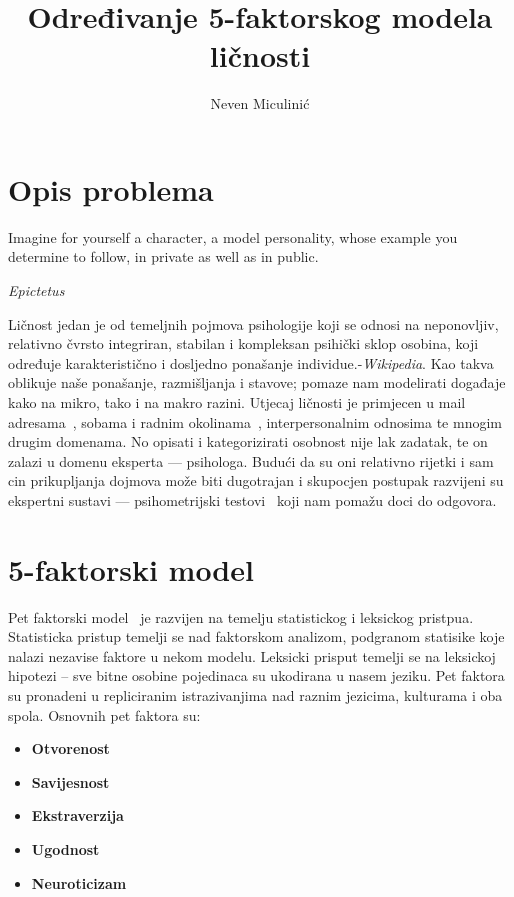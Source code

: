 \documentclass[times, utf8, seminar]{fer}
\begin{document}
\theoremstyle{definition}
\newtheorem{definition}{Definition}[section]

\title{Određivanje 5-faktorskog modela ličnosti}
\author{Neven Miculinić}

\maketitle
\tableofcontents

\chapter{Opis problema}

\epigraph{Imagine for yourself a character, a model personality, whose example you determine to follow, in private as well as in public.
}{\textit{Epictetus}}
Ličnost jedan je od temeljnih pojmova psihologije koji se odnosi na neponovljiv, relativno čvrsto integriran, stabilan i kompleksan psihički sklop osobina, koji određuje karakteristično i dosljedno ponašanje individue.-\textit{Wikipedia}.
Kao takva oblikuje naše ponašanje, razmišljanja i stavove; pomaze nam modelirati događaje kako na mikro, tako i na makro razini. Utjecaj ličnosti je primjecen u mail adresama~\cite{mail-personality}, sobama i radnim okolinama~\cite{gosling2002room}, interpersonalnim odnosima te mnogim drugim domenama.
No opisati i kategorizirati osobnost nije lak zadatak, te on zalazi u domenu eksperta --- psihologa.
Budući da su oni relativno rijetki i sam cin prikupljanja dojmova može biti dugotrajan i skupocjen postupak razvijeni su ekspertni sustavi --- psihometrijski testovi~\cite{cronbach1949essentials} koji nam pomažu doci do odgovora.
\chapter{5-faktorski model}

Pet faktorski model~\cite{mccrae1992introduction} je razvijen na temelju statistickog i leksickog pristpua. Statisticka pristup temelji se nad faktorskom analizom, podgranom statisike koje nalazi nezavise faktore u nekom modelu. Leksicki prisput temelji se na leksickoj hipotezi -- sve bitne osobine pojedinaca su ukodirana u nasem jeziku. Pet faktora su pronadeni u repliciranim istrazivanjima nad raznim jezicima, kulturama i oba spola. Osnovnih pet faktora su:

\begin{itemize}
    \item \textbf{Otvorenost}
    \item \textbf{Savijesnost}
    \item \textbf{Ekstraverzija}
    \item \textbf{Ugodnost}
    \item \textbf{Neuroticizam}
\end{itemize}
\end{document}
